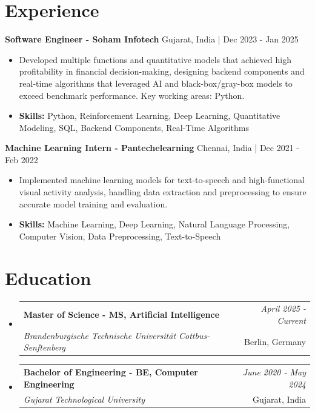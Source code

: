 \documentclass[a4paper,11pt]{article}
\makeatletter
\newcommand{\resumeSubheading}[4]{
\vspace{0.5mm}\item
    \begin{tabular*}{\linewidth}[t]{l@{\extracolsep{\fill}}r}
        \textbf{#1} & \textit{\footnotesize{#4}} \\
        \textit{\footnotesize{#3}} &  \footnotesize{#2}\\
    \end{tabular*}
    \vspace{-2.4mm}
}
\makeatother
\begin{document}
\section{\textbf{Experience}}


\vspace{1mm}
  \textbf{Software Engineer - Soham Infotech} \hfill Gujarat, India | Dec 2023 - Jan 2025
\vspace{-1.5mm} %
\begin{itemize}
  \item Developed multiple functions and quantitative models that achieved high profitability in financial decision-making, designing backend components and real-time algorithms that leveraged AI and black-box/gray-box models to exceed benchmark performance. Key working areas: Python.

\vspace{-2mm}
  \item \textbf{Skills:} Python, Reinforcement Learning, Deep Learning, Quantitative Modeling, SQL, Backend Components, Real-Time Algorithms
\end{itemize}

\vspace{1mm}
  \textbf{Machine Learning Intern - Pantechelearning} \hfill Chennai, India | Dec 2021 - Feb 2022
\vspace{-1.5mm} %
\begin{itemize}
  \item Implemented machine learning models for text-to-speech and high-functional visual activity analysis, handling data extraction and preprocessing to ensure accurate model training and evaluation.
\vspace{-2mm}
  \item \textbf{Skills:} Machine Learning, Deep Learning, Natural Language Processing, Computer Vision, Data Preprocessing, Text-to-Speech
\end{itemize}\section{\textbf{Education}}
\vspace{-0.4mm}

\begin{itemize}[leftmargin=0.15in, label={}]
\resumeSubheading
{Master of Science - MS, Artificial Intelligence }{Berlin, Germany}
{Brandenburgische Technische Universität Cottbus-Senftenberg  }{April 2025 - Current}

\vspace{1.0mm} %
\resumeSubheading
{Bachelor of Engineering - BE, Computer Engineering  }{Gujarat, India}
{Gujarat Technological University }{June 2020 - May 2024}

\end{itemize}
\end{document}
